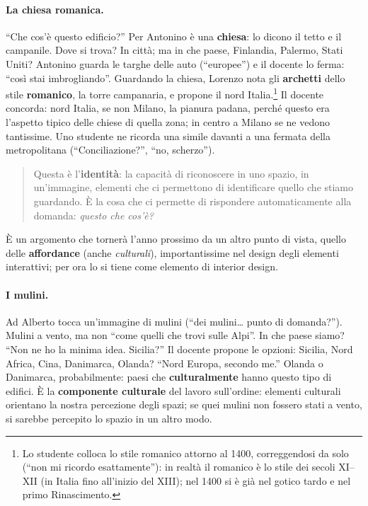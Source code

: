 \paragraph{La chiesa romanica.} ``Che cos'è questo edificio?'' Per Antonino è una
\textbf{chiesa}: lo dicono il tetto e il campanile. Dove si trova? In città; ma in che
paese, Finlandia, Palermo, Stati Uniti? Antonino guarda le targhe delle auto
(``europee'') e il docente lo ferma: ``così stai imbrogliando''. Guardando la chiesa,
Lorenzo nota gli \textbf{archetti} dello stile \textbf{romanico}, la torre campanaria, e
propone il nord Italia.\footnote{Lo studente colloca lo stile romanico attorno al 1400,
correggendosi da solo (``non mi ricordo esattamente''): in realtà il romanico è lo stile
dei secoli XI--XII (in Italia fino all'inizio del XIII); nel 1400 si è già nel gotico
tardo e nel primo Rinascimento.} Il docente concorda: nord Italia, se non Milano, la
pianura padana, perché questo era l'aspetto tipico delle chiese di quella zona; in centro
a Milano se ne vedono tantissime. Uno studente ne ricorda una simile davanti a una fermata
della metropolitana (``Conciliazione?'', ``no, scherzo'').
\begin{quote}
Questa è l'\textbf{identità}: la capacità di riconoscere in uno spazio, in un'immagine,
elementi che ci permettono di identificare quello che stiamo guardando. È la cosa che ci
permette di rispondere automaticamente alla domanda: \emph{questo che cos'è?}
\end{quote}
È un argomento che tornerà l'anno prossimo da un altro punto di vista, quello delle
\textbf{affordance} (anche \emph{culturali}), importantissime nel design degli elementi
interattivi; per ora lo si tiene come elemento di interior design.

\paragraph{I mulini.} Ad Alberto tocca un'immagine di mulini (``dei mulini\ldots{} punto
di domanda?''). Mulini a vento, ma non ``come quelli che trovi sulle Alpi''. In che paese
siamo? ``Non ne ho la minima idea. Sicilia?'' Il docente propone le opzioni: Sicilia, Nord
Africa, Cina, Danimarca, Olanda? ``Nord Europa, secondo me.'' Olanda o Danimarca,
probabilmente: paesi che \textbf{culturalmente} hanno questo tipo di edifici. È la
\textbf{componente culturale} del lavoro sull'ordine: elementi culturali orientano la
nostra percezione degli spazi; se quei mulini non fossero stati a vento, si sarebbe
percepito lo spazio in un altro modo.

